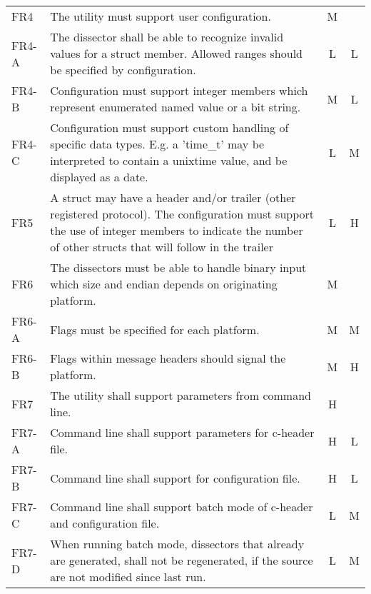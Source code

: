 \begin{table}[ht]
\begin{tabularx}{\textwidth}{l X c c}
	\midrule
	FR4 & The utility must support user configuration.
		& M & \\
	FR4-A & The dissector shall be able to recognize invalid values for
		a struct member. Allowed ranges should be specified by configuration.
		& L & L \\
	FR4-B & Configuration must support integer members which represent
		enumerated named value or a bit string.
		& M & L \\
	FR4-C & Configuration must support custom handling of specific data
		types. E.g. a 'time\_t' may be interpreted to contain a unixtime value,
		and be displayed as a date.
		& L & M \\
	\midrule
	FR5 & A struct may have a header and/or trailer (other registered
		protocol). The configuration must support the use of integer members to
		indicate the number of other structs that will follow in the trailer
		& L & H \\
	\midrule
	FR6 & The dissectors must be able to handle binary input which size
		and endian depends on originating platform.
		& M & \\
	FR6-A & Flags must be specified for each platform.
		& M & M \\
	FR6-B & Flags within message headers should signal the platform.
		& M & H \\
	\midrule
	FR7 & The utility shall support parameters from command line.
		& H & \\
	FR7-A & Command line shall support parameters for c-header file.
		& H & L \\
	FR7-B & Command line shall support for configuration file.
		& H & L \\
	FR7-C & Command line shall support batch mode of c-header and
		configuration file.
		& L & M \\
	FR7-D & When running batch mode, dissectors that already are
		generated, shall not be regenerated, if the source are not modified
		since last run.
		& L & M \\
	\bottomrule
\end{tabularx}
\end{table}

